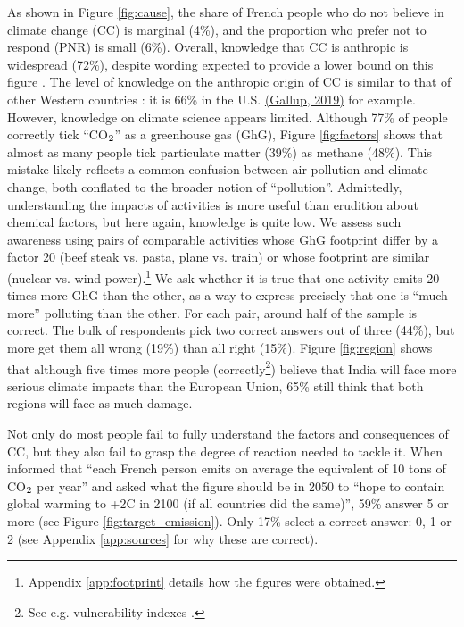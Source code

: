 \documentclass[english,5p,authoryear]{elsarticle}
\begin{document}
As shown in Figure \ref{fig:cause}, the share of French people who do not believe in climate change (CC) is marginal (4\%), and the proportion who prefer not to respond (PNR) is small (6\%). Overall, knowledge that CC is anthropic is widespread (72\%), despite wording expected to provide a lower bound on this figure \citep{motta_experimental_2019}. The level of knowledge on the anthropic origin of CC is similar to that of other Western countries \citep{leiserowitz_international_2007,lee_predictors_2015,stokes_global_2015-1}: it is 66\% in the U.S. \href{https://news.gallup.com/poll/1615/environment.aspx}{(Gallup, 2019)} for example. However, knowledge on climate science appears limited. Although 77\% of people correctly tick ``CO$_\textnormal{2}$'' as a greenhouse gas (GhG), Figure \ref{fig:factors} shows that almost as many people tick particulate matter (39\%) as methane (48\%). This mistake likely reflects a common confusion between air pollution and climate change, both conflated to the broader notion of ``pollution''. Admittedly, understanding the impacts of activities is more useful than erudition about chemical factors, but here again, knowledge is quite low. We assess such awareness using pairs of comparable activities whose GhG footprint differ by a factor 20 (beef steak vs. pasta, plane vs. train) or whose footprint are similar (nuclear vs. wind power).\footnote{Appendix \ref{app:footprint} details how the figures were obtained.} We ask whether it is true that one activity emits 20 times more GhG than the other, as a way to express precisely that one is ``much more'' polluting than the other. For each pair, around half of the sample is correct. The bulk of respondents pick two correct answers out of three (44\%), but more get them all wrong (19\%) than all right (15\%). Figure \ref{fig:region} shows that although five times more people (correctly\footnote{See e.g. vulnerability indexes \citep{climate_vulnerable_forum_climate_2012,guillaumont_measuring_2015,closset_physical_2018}.}) believe that India will face more serious climate impacts than the European Union, 65\% still think that both regions will face as much damage. 

Not only do most people fail to fully understand the factors and consequences of CC, but they also fail to grasp the degree of reaction needed to tackle it. When informed that ``each French person emits on average the equivalent of 10 tons of CO$_\textnormal{2}$ per year'' and asked what the figure should be in 2050 to ``hope to contain global warming to +2\textdegree{}C in 2100 (if all countries did the same)'', 59\% answer 5 or more (see Figure \ref{fig:target_emission}). Only 17\% select a correct answer: 0, 1 or 2 (see Appendix \ref{app:sources} for why these are correct).
\end{document}
